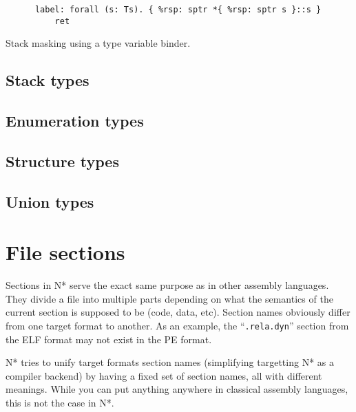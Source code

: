 \begin{listing}[htb]
  \centering
  \begin{minipage}{0.80\textwidth}
    \begin{verbatim}
      label: forall (s: Ts). { %rsp: sptr *{ %rsp: sptr s }::s }
          ret
    \end{verbatim}
  \end{minipage}
  \caption{Stack masking using a type variable binder.}
  \label{lst:nstar-common-ts-records-stackmask}
\end{listing}

\subsection{Stack types}\label{subsec:nstar-common-ts-stack}


\subsection{Enumeration types}\label{subsec:nstar-common-ts-enums}


\subsection{Structure types}\label{subsec:nstar-common-ts-structs}


\subsection{Union types}\label{subsec:nstar-common-ts-unions}


\section{File sections}\label{sec:nstar-common-sections}

Sections in N* serve the exact same purpose as in other assembly languages. They divide a file into multiple parts depending on what the semantics of the current section is supposed to be (code, data, etc).
Section names obviously differ from one target format to another. As an example, the ``\texttt{.rela.dyn}'' section from the ELF format may not exist in the PE format.

N* tries to unify target formats section names (simplifying targetting N* as a compiler backend) by having a fixed set of section names, all with different meanings. While you can put anything anywhere in classical assembly languages, this is not the case in N*.

